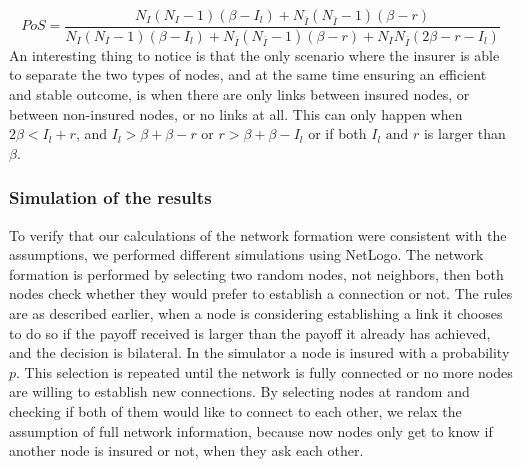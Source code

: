 \begin{equation}
PoS=\frac{N_{I}(N_{I}-1)(\beta-I_{l})+N_{\overline{I}}(N_{\overline{I}}-1)(\beta-r)}{N_{I}(N_{I}-1)(\beta-I_{l})+N_{\overline{I}}(N_{\overline{I}}-1)(\beta-r)+N_{I}N_{\overline{I}}(2\beta-r-I_{l})}
\label{eq:model2-pos}
\end{equation}
An interesting thing to notice is that the only scenario where the insurer is able to separate the two types of nodes, and at the same time ensuring an efficient and stable outcome, is when there are only links between insured nodes, or between non-insured nodes, or no links at all.
This can only happen when $2\beta<I_{l}+r$, and $I_{l}>\beta+\beta-r$ or $r>\beta+\beta-I_{l}$ or if both $I_{l} \text{ and }r$ is larger than $\beta$.

\subsubsection{Simulation of the results}
To verify that our calculations of the network formation were consistent with the assumptions, we performed different simulations using NetLogo. The network formation is performed by selecting two random nodes, not neighbors, then both nodes check whether they would prefer to establish a connection or not. 
The rules are as described earlier, when a node is considering establishing a link it chooses to do so if the payoff received is larger than the payoff it already has achieved, and the decision is bilateral.
In the simulator a node is insured with a probability $p$. This selection is repeated until the network is fully connected or no more nodes are willing to establish new connections.
By selecting nodes at random and checking if both of them would like to connect to each other, we relax the assumption of full network information, because now nodes only get to know if another node is insured or not, when they ask each other.

